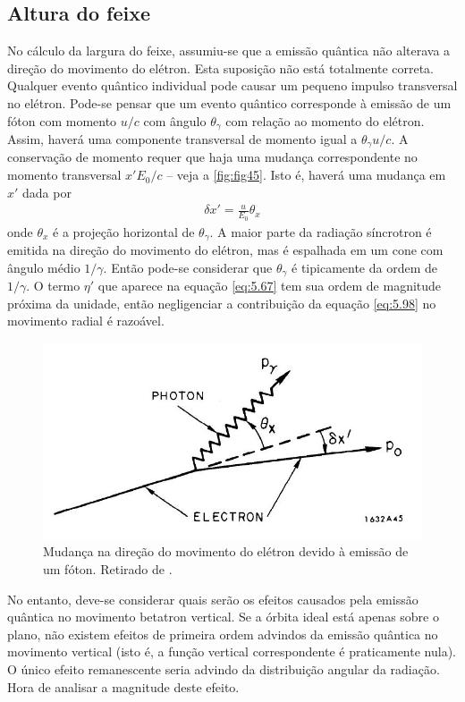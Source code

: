 \subsection{Altura do feixe}\label{sec:5.6}
No cálculo da largura do feixe, assumiu-se que a emissão quântica não alterava a direção do movimento do elétron. Esta suposição não está totalmente correta. Qualquer evento quântico individual pode causar um pequeno impulso transversal no elétron. Pode-se pensar que um evento quântico corresponde à emissão de um fóton com momento $u/c$ com ângulo $\theta_\gamma$ com relação ao momento do elétron. Assim, haverá uma componente transversal de momento igual a $\theta_\gamma u/c$. A conservação de momento requer que haja uma mudança correspondente no momento transversal $x' E_0/c$ -- veja a \autoref{fig:fig45}. Isto é, haverá uma mudança em $x'$ dada por
\begin{align}
	\delta x' = \frac{u}{E_0} \theta_x\label{eq:5.98}
\end{align}
onde $\theta_x$ é a projeção horizontal de $\theta_\gamma$. A maior parte da radiação síncrotron é emitida na direção do movimento do elétron, mas é espalhada em um cone com ângulo médio $1/\gamma$. Então pode-se considerar que $\theta_\gamma$ é tipicamente da ordem de $1/\gamma$. O termo $\eta'$ que aparece na equação \eqref{eq:5.67} tem sua ordem de magnitude próxima da unidade, então negligenciar a contribuição da equação \eqref{eq:5.98} no movimento radial é razoável.

\begin{figure}[!htb]
	\centering
	\includegraphics[width=0.9\linewidth]{./Figuras/fig45.jpeg}
	\caption{Mudança na direção do movimento do elétron devido à emissão de um fóton. Retirado de \cite{sands1970physics}.}
	\label{fig:fig45}
\end{figure}

No entanto, deve-se considerar quais serão os efeitos causados pela emissão quântica no movimento betatron vertical. Se a órbita ideal está apenas sobre o plano, não existem efeitos de primeira ordem advindos da emissão quântica no movimento vertical (isto é, a função vertical correspondente é praticamente nula). O único efeito remanescente seria advindo da distribuição angular da radiação. Hora de analisar a magnitude deste efeito.

